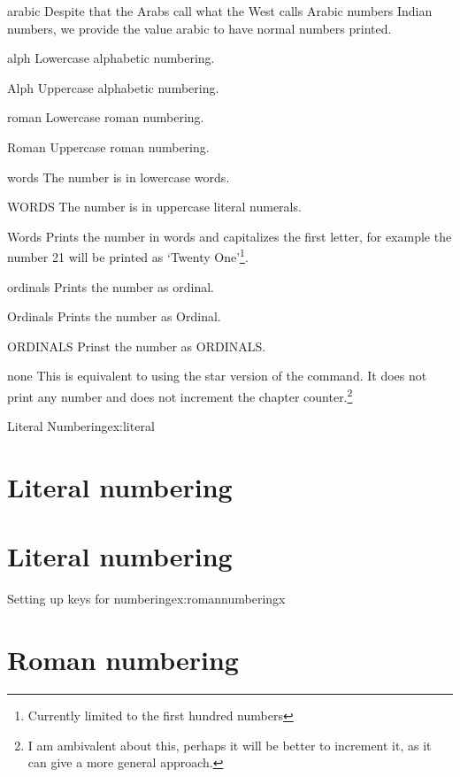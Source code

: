 \begin{marglist}
\item [arabic] Despite that the Arabs call what the West calls Arabic numbers Indian numbers, we provide the value arabic to have normal numbers printed.
\item [alph] Lowercase alphabetic numbering.
\item [Alph] Uppercase alphabetic numbering.
\item [roman] Lowercase roman numbering.
\item [Roman] Uppercase roman numbering.
\item [words] The number is in lowercase words.
\item [WORDS] The number is in uppercase literal numerals.
\item [Words] Prints the number in words and capitalizes the first letter, for example the number 21 will be printed as `Twenty One'\footnote{Currently limited to the first hundred numbers}.
\item [ordinals] Prints the number as ordinal.
\item [Ordinals] Prints the number as Ordinal.
\item [ORDINALS] Prinst the number as ORDINALS.
\item [none] This is equivalent to using the star version of the command. It does not print any number and does not increment the chapter counter.\footnote{I am ambivalent about this, perhaps it will be better to increment it, as it can give a more general approach.}

\end{marglist}
\begin{texexample}{Literal Numbering}{ex:literal}
\chapter{Literal numbering}
\lorem
{}
\chapter{Literal numbering} 
\lorem
\end{texexample}





\begin{texexample}{Setting up keys for numbering}{ex:romannumberingx}
\bgroup
{}
\chapter{Roman numbering}
\lorem
\egroup
\end{texexample}






